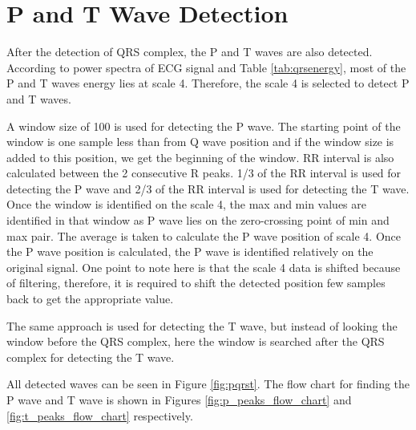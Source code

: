 \section{P and T Wave Detection}

After the detection of QRS complex, the P and T waves are also detected. According to power spectra of ECG signal \cite{4121752} and Table \ref{tab:qrsenergy}, most of the P and T waves energy lies at scale 4. Therefore, the scale 4 is selected to detect P and T waves. 

A window size of 100 is used for detecting the P wave. The starting point of the window is one sample less than from Q wave position and if the window size is added to this position, we get the beginning of the window. RR interval is also calculated between the 2 consecutive R peaks. 1/3 of the RR interval is used for detecting the P wave and 2/3 of the RR interval is used for detecting the T wave. Once the window is identified on the scale 4, the max and min values are identified in that window as P wave lies on the zero-crossing point of min and max pair. The average is taken to calculate the P wave position of scale 4. Once the P wave position is calculated, the P wave is identified relatively on the original signal. One point to note here is that the scale 4 data is shifted because of filtering, therefore, it is required to shift the detected position few samples back to get the appropriate value.

The same approach is used for detecting the T wave, but instead of looking the window before the QRS complex, here the window is searched after the QRS complex for detecting the T wave.

All detected waves can be seen in Figure \ref{fig:pqrst}. The flow chart for finding the P wave and T wave is shown in Figures \ref{fig:p_peaks_flow_chart} and \ref{fig:t_peaks_flow_chart} respectively.


